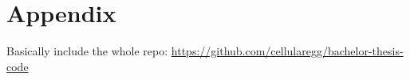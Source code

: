 \chapter{Appendix}
Basically include the whole repo: \url{https://github.com/cellularegg/bachelor-thesis-code}

